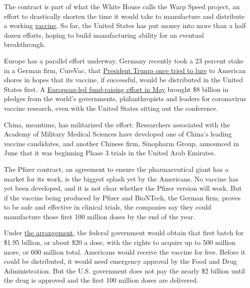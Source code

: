 The contract is part of what the White House calls the Warp Speed
project, an effort to drastically shorten the time it would take to
manufacture and distribute a working
\href{https://www.nytimes.com/2020/07/22/upshot/vaccine-coronavirus-government-purchase.html}{vaccine}.
So far, the United States has put money into more than a half dozen
efforts, hoping to build manufacturing ability for an eventual
breakthrough.

Europe has a parallel effort underway. Germany recently took a 23
percent stake in a German firm, CureVac, that
\href{https://www.nytimes.com/2020/03/15/world/europe/cornonavirus-vaccine-us-germany.html}{President
Trump once tried to lure} to American shores in hopes that its vaccine,
if successful, would be distributed in the United States first. A
\href{https://www.nytimes.com/2020/05/04/world/europe/eu-coronavirus-vaccine.html}{European-led
fund-raising effort in May} brought \$8 billion in pledges from the
world's governments, philanthropists and leaders for coronavirus vaccine
research, even with the United States sitting out the conference.

China, meantime, has militarized the effort: Researchers associated with
the Academy of Military Medical Sciences have developed one of China's
leading vaccine candidates, and another Chinese firm, Sinopharm Group,
announced in June that it was beginning Phase 3 trials in the United
Arab Emirates.

The Pfizer contract, an agreement to ensure the pharmaceutical giant has
a market for its work, is the biggest splash yet by the Americans. No
vaccine has yet been developed, and it is not clear whether the Pfizer
version will work. But if the vaccine being produced by Pfizer and
BioNTech, the German firm, proves to be safe and effective in clinical
trials, the companies say they could manufacture those first 100 million
doses by the end of the year.

Under
\href{https://www.businesswire.com/news/home/20200722005438/en/Pfizer-BioNTech-Announce-Agreement-U.S.-Government-600}{the
arrangement}, the federal government would obtain that first batch for
\$1.95 billion, or about \$20 a dose, with the rights to acquire up to
500 million more, or 600 million total. Americans would receive the
vaccine for free. Before it could be distributed, it would need
emergency approval by the Food and Drug Administration. But the U.S.
government does not pay the nearly \$2 billion until the drug is
approved and the first 100 million doses are delivered.

